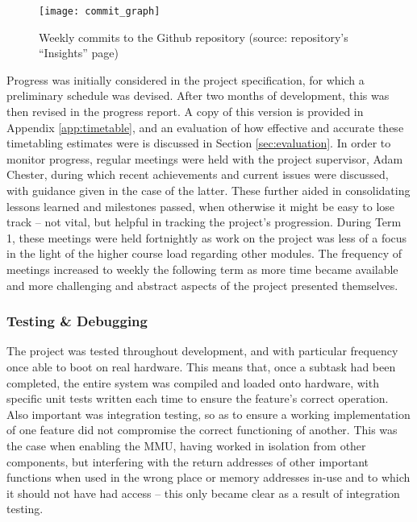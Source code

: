         \begin{figure}[h]
            \centering
            \texttt{[image: commit\_graph]}
            \caption{Weekly commits to the Github repository (source:
            repository's ``Insights'' page)}
            \label{fig:commits}
        \end{figure}

        Progress was initially considered in the project specification, for
        which a preliminary schedule was devised. After two months of
        development, this was then revised in the progress report.  A copy of
        this version is provided in Appendix \ref{app:timetable}, and an
        evaluation of how effective and accurate these timetabling estimates
        were is discussed in Section \ref{sec:evaluation}. In order to monitor
        progress, regular meetings were held with the project supervisor, Adam
        Chester, during which recent achievements and current issues were
        discussed, with guidance given in the case of the latter. These further
        aided in consolidating lessons learned and milestones passed, when
        otherwise it might be easy to lose track -- not vital, but helpful in
        tracking the project's progression. During Term 1, these meetings were
        held fortnightly as work on the project was less of a focus in the light
        of the higher course load regarding other modules. The frequency of
        meetings increased to weekly the following term as more time became
        available and more challenging and abstract aspects of the project
        presented themselves.

    \subsubsection{Testing \& Debugging}
        The project was tested throughout development, and with particular
        frequency once able to boot on real hardware. This means that, once a
        subtask had been completed, the entire system was compiled and loaded
        onto hardware, with specific unit tests written each time to ensure the
        feature's correct operation. Also important was integration testing, so
        as to ensure a working implementation of one feature did not compromise
        the correct functioning of another. This was the case when enabling the
        MMU, having worked in isolation from other components, but interfering
        with the return addresses of other important functions when used in the
        wrong place or memory addresses in-use and to which it should not have
        had access -- this only became clear as a result of integration testing.

